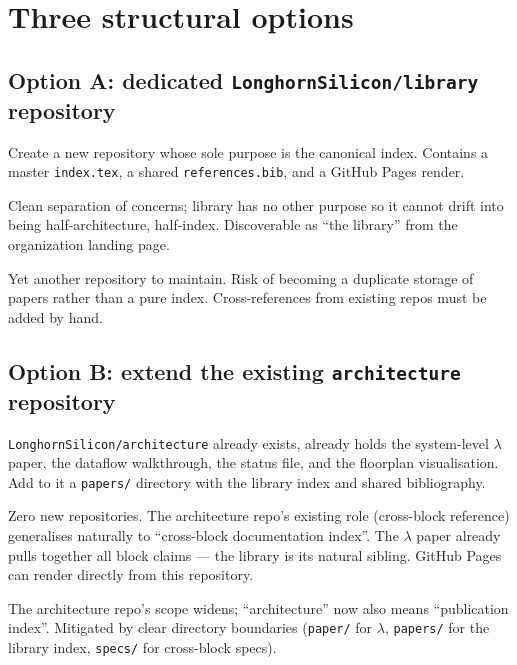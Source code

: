 \documentclass[11pt]{article}
\begin{document}
\section{Three structural options}

\subsection{Option A: dedicated \texttt{LonghornSilicon/library} repository}

Create a new repository whose sole purpose is the canonical index.
Contains a master \texttt{index.tex}, a shared \texttt{references.bib},
and a GitHub Pages render.

\begin{description}[leftmargin=2em,style=nextline]
\item[Pros]
Clean separation of concerns; library has no other purpose so it
cannot drift into being half-architecture, half-index. Discoverable
as ``the library'' from the organization landing page.
\item[Cons]
Yet another repository to maintain. Risk of becoming a duplicate
storage of papers rather than a pure index. Cross-references from
existing repos must be added by hand.
\end{description}

\subsection{Option B: extend the existing \texttt{architecture} repository}

\texttt{LonghornSilicon/architecture} already exists, already holds
the system-level $\lambda$ paper, the dataflow walkthrough, the
status file, and the floorplan visualisation. Add to it a
\texttt{papers/} directory with the library index and shared
bibliography.

\begin{description}[leftmargin=2em,style=nextline]
\item[Pros]
Zero new repositories. The architecture repo's existing role
(cross-block reference) generalises naturally to ``cross-block
documentation index''. The $\lambda$ paper already pulls together
all block claims --- the library is its natural sibling. GitHub
Pages can render directly from this repository.
\item[Cons]
The architecture repo's scope widens; ``architecture'' now also
means ``publication index''. Mitigated by clear directory boundaries
(\texttt{paper/} for $\lambda$, \texttt{papers/} for the library
index, \texttt{specs/} for cross-block specs).
\end{description}
\end{document}

